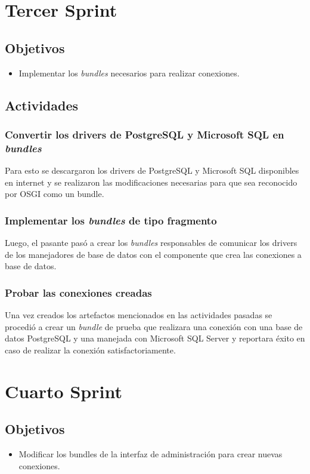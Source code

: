 \section{Tercer Sprint}

\subsection{Objetivos}
\begin{itemize}
  \item Implementar los \emph{bundles} necesarios para realizar conexiones.
\end{itemize}
\subsection{Actividades}
\subsubsection{Convertir los drivers de PostgreSQL y Microsoft SQL en \emph{bundles}}
Para esto se descargaron los drivers de PostgreSQL y Microsoft SQL disponibles en
internet y se realizaron las modificaciones necesarias para que sea reconocido por
OSGI como un bundle.
\subsubsection{Implementar los \emph{bundles} de tipo fragmento}
Luego, el pasante pasó a crear los \emph{bundles} responsables de comunicar los
drivers de los manejadores de base de datos con el componente que crea las conexiones
a base de datos.
\subsubsection{Probar las conexiones creadas}
Una vez creados los artefactos mencionados en las actividades pasadas se procedió
a crear un \emph{bundle} de prueba que realizara una conexión con una base de datos
PostgreSQL y una manejada con Microsoft SQL Server y reportara éxito en caso de
realizar la conexión satisfactoriamente.

\section{Cuarto Sprint}

\subsection{Objetivos}
\begin{itemize}
  \item Modificar los bundles de la interfaz de administración para crear nuevas
  conexiones.
\end{itemize}
